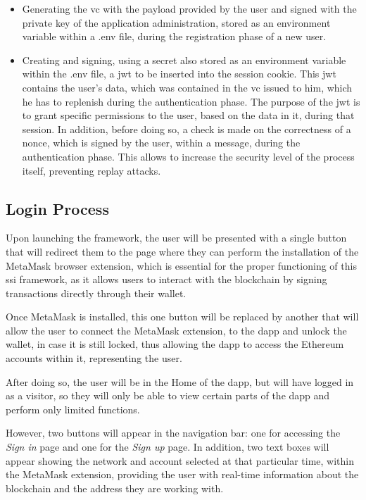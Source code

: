 \begin{itemize}
  \item Generating the \gls{vc} with the payload provided by the user and signed with the private key of the application administration, stored as an environment variable within 
  a .env file, during the registration phase of a new user.
  \item	Creating and signing, using a secret also stored as an environment variable within the .env file, a \gls{jwt} to be inserted into the session cookie. 
  This \gls{jwt} contains the user's data, which was contained in the \gls{vc} issued to him, which he has to replenish during the authentication phase. The purpose of the \gls{jwt} is to 
  grant specific permissions to the user, based on the data in it, during that session. In addition, before doing so, a check is made on the correctness of a \gls{nonce}, 
  which is signed by the user, within a message, during the authentication phase. This allows to increase the security level of the process itself, preventing replay attacks.
\end{itemize}

\subsection{Login Process}

Upon launching the framework, the user will be presented with a single button that will redirect them to the page where they can perform the installation of the MetaMask 
browser extension, which is essential for the proper functioning of this \gls{ssi} framework, as it allows users to interact with the blockchain by signing transactions directly 
through their wallet.

Once MetaMask is installed, this one button will be replaced by another that will allow the user to connect the MetaMask extension, to the \gls{dapp} and unlock the wallet,
in case it is still locked, thus allowing the \gls{dapp} to access the Ethereum accounts within it, representing the user.

After doing so, the user will be in the Home of the \gls{dapp}, but will have logged in as a visitor, so they will only be able to view certain parts of the \gls{dapp} 
and perform only limited functions.

However, two buttons will appear in the navigation bar: one for accessing the \textit{Sign in} page and one for the \textit{Sign up} page. In addition, two text boxes will appear showing the 
network and account selected at that particular time, within the MetaMask extension, providing the user with real-time information about the blockchain and the address they 
are working with.


